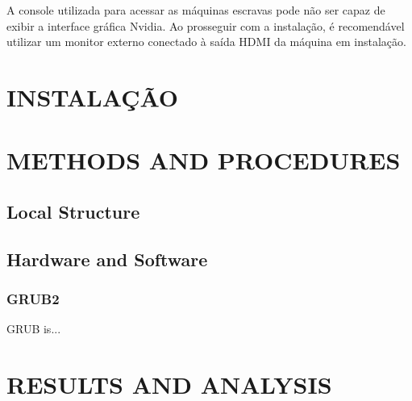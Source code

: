 \documentclass[twoside,a4paper,12pt,english]{inac17}
\begin{document}
\begin{shadedbox}
A console utilizada para acessar as máquinas escravas pode não ser capaz 
de exibir a interface gráfica Nvidia. Ao prosseguir com a instalação, é recomendável 
utilizar um monitor externo conectado à saída HDMI da máquina em instalação.
\end{shadedbox}

\section{INSTALAÇÃO}


\section{METHODS AND PROCEDURES}

\subsection{Local Structure}


\subsection{Hardware and Software}



\subsubsection{GRUB2}
\label{ssub:grub}

GRUB is...


\section{RESULTS AND ANALYSIS}
\end{document}
